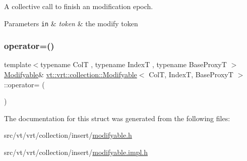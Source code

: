 A collective call to finish an modification epoch. 


\begin{DoxyParams}[1]{Parameters}
\mbox{\tt in}  & {\em token} & the modify token \\
\hline
\end{DoxyParams}
\mbox{\label{structvt_1_1vrt_1_1collection_1_1_modifyable_ac3da902e782f40f8107509e63a86d072}} 
\subsubsection{\texorpdfstring{operator=()}{operator=()}}
{\footnotesize\ttfamily template$<$typename ColT , typename IndexT , typename Base\+ProxyT $>$ \\
\hyperlink{structvt_1_1vrt_1_1collection_1_1_modifyable}{Modifyable}\& \hyperlink{structvt_1_1vrt_1_1collection_1_1_modifyable}{vt\+::vrt\+::collection\+::\+Modifyable}$<$ ColT, IndexT, Base\+ProxyT $>$\+::operator= (\begin{DoxyParamCaption}\item[{\hyperlink{structvt_1_1vrt_1_1collection_1_1_modifyable}{Modifyable}$<$ ColT, IndexT, Base\+ProxyT $>$ const \&}]{ }\end{DoxyParamCaption})\hspace{0.3cm}{\ttfamily [default]}}



The documentation for this struct was generated from the following files\+:\begin{DoxyCompactItemize}
\item 
src/vt/vrt/collection/insert/\hyperlink{modifyable_8h}{modifyable.\+h}\item 
src/vt/vrt/collection/insert/\hyperlink{modifyable_8impl_8h}{modifyable.\+impl.\+h}\end{DoxyCompactItemize}
